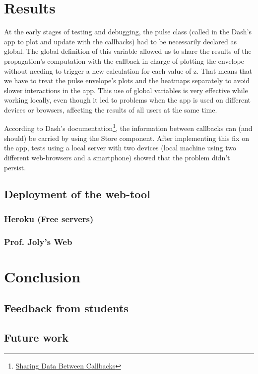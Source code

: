 \chapter{Results}
    At the early stages of testing and debugging, the pulse class (called in the Dash's app to plot and update with the callbacks) had to be necessarily declared as global. The global definition of this variable allowed us to share the results of the propagation's computation with the callback in charge of plotting the envelope without needing to trigger a new calculation for each value of z. That means that we have to treat the pulse envelope's plots and the heatmaps separately to avoid slower interactions in the app. This use of global variables is very effective while working locally, even though it led to problems when the app is used on different devices or browsers, affecting the results of all users at the same time.

According to Dash's documentation\footnote{\href{https://dash.plotly.com/sharing-data-between-callbacks}{Sharing Data Between Callbacks}}, the information between callbacks can (and should) be carried by using the Store component. After implementing this fix on the app, tests using a local server with two devices (local machine using two different web-browsers and a smartphone) showed that the problem didn't persist.
    \section{Deployment of the web-tool}
        \subsection{Heroku (Free servers)}
        \subsection{Prof. Joly's Web}




\chapter{Conclusion}
    \section{Feedback from students}
    \section{Future work}